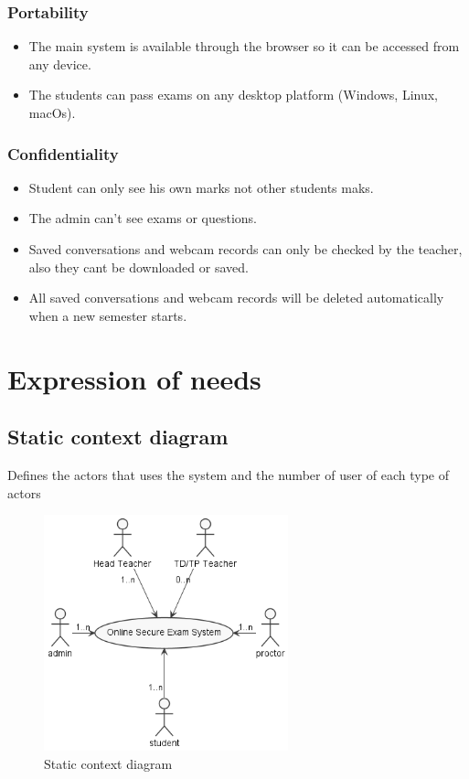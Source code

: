 \documentclass[]{uc2pfecaneva}
\begin{document}
    \raggedright\subsubsection{Portability}
    \begin{itemize}
        \item The main system is available through the browser so it can be accessed from any device.
        \item The students can pass exams on any desktop platform (Windows, Linux, macOs).
    \end{itemize}

    \raggedright\subsubsection{Confidentiality}
    \begin{itemize}
        \item Student can only see his own marks not other students maks.
        \item The admin can’t see exams or questions.
        \item Saved conversations and webcam records can only be checked by the teacher, also they cant be downloaded or saved.
        \item All saved conversations and webcam records will be deleted automatically when a new semester starts.
    \end{itemize}

    \raggedright\section{Expression of needs}
    \raggedright\subsection{Static context diagram}
    Defines the actors that uses the system and the number of user of each type of actors
    \begin{figure}[h]

        \centering
        \includegraphics[width=200pt]{images/SCD}
        \caption{Static context diagram}
    \end{figure}
\end{document}
